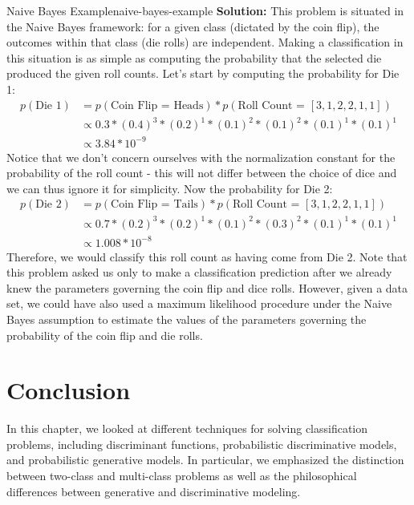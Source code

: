 \begin{example}{Naive Bayes Example}{naive-bayes-example}
	\textbf{Solution:} \newline
	This problem is situated in the Naive Bayes framework: for a given class (dictated by the coin flip), the outcomes within that class (die rolls) are independent. Making a classification in this situation is as simple as computing the probability that the selected die produced the given roll counts. Let's start by computing the probability for Die 1:
	\begin{align*}
		p(\text{Die 1}) &= p(\text{Coin Flip = Heads}) * p(\text{Roll Count = }[3,1,2,2,1,1]) \\
		&\propto 0.3 * (0.4)^{3} * (0.2)^{1} * (0.1)^{2} * (0.1)^{2} * (0.1)^{1} * (0.1)^{1} \\
		&\propto 3.84 * 10^{-9}
	\end{align*}
	Notice that we don't concern ourselves with the normalization constant for the probability of the roll count - this will not differ between the choice of dice and we can thus ignore it for simplicity. Now the probability for Die 2:
	\begin{align*}
		p(\text{Die 2}) &= p(\text{Coin Flip = Tails}) * p(\text{Roll Count = }[3,1,2,2,1,1]) \\
		&\propto 0.7 * (0.2)^{3} * (0.2)^{1} * (0.1)^{2} * (0.3)^{2} * (0.1)^{1} * (0.1)^{1} \\
		&\propto 1.008 * 10^{-8}
	\end{align*}
	Therefore, we would classify this roll count as having come from Die 2. \newline \newline
	Note that this problem asked us only to make a classification prediction after we already knew the parameters governing the coin flip and dice rolls. However, given a data set, we could have also used a maximum likelihood procedure under the Naive Bayes assumption to estimate the values of the parameters governing the probability of the coin flip and die rolls.
\end{example}

\section{Conclusion}
In this chapter, we looked at different techniques for solving classification problems, including discriminant functions, probabilistic discriminative models, and probabilistic generative models. In particular, we emphasized the distinction between two-class and multi-class problems as well as the philosophical differences between generative and discriminative modeling.

